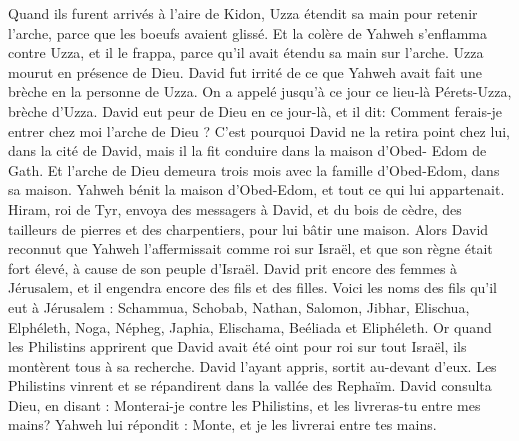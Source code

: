 \begin{multicols}{2}
Quand ils furent arrivés à l'aire de Kidon, Uzza  étendit sa main pour retenir l’arche, parce que les boeufs avaient glissé.
Et la colère de Yahweh s'enflamma contre Uzza, et il le frappa, parce qu'il avait étendu sa main sur l’arche. Uzza mourut en présence de Dieu.
David fut irrité de ce que Yahweh avait fait une brèche en la personne de Uzza. On a appelé jusqu'à ce jour ce lieu-là Pérets-Uzza, brèche d'Uzza.
David eut peur de Dieu en ce jour-là, et il dit: Comment ferais-je entrer chez moi l’arche de Dieu ?
C'est pourquoi David ne la retira point chez lui, dans la cité de David, mais il la fit conduire dans la maison d'Obed- Edom de Gath.
Et l’arche de Dieu demeura trois mois avec la famille d'Obed-Edom, dans sa maison. Yahweh bénit la maison d'Obed-Edom, et tout ce qui lui appartenait.
\VerseOne{}Hiram, roi de Tyr, envoya des messagers à David, et du bois de cèdre, des tailleurs de pierres et des charpentiers, pour lui bâtir une maison.
Alors David reconnut que Yahweh l'affermissait comme roi sur Israël, et que son règne était fort élevé, à cause de son peuple d'Israël.
David prit encore des femmes à Jérusalem, et il engendra encore des fils et des filles.
Voici les noms des fils qu'il eut à Jérusalem : Schammua, Schobab, Nathan, Salomon,
Jibhar, Elischua, Elphéleth,
Noga, Népheg, Japhia,
Elischama, Beéliada et Eliphéleth.
Or quand les Philistins apprirent que David avait été oint pour roi sur tout Israël, ils montèrent tous à sa recherche. David l'ayant appris, sortit au-devant d'eux.
Les Philistins vinrent et se répandirent dans la vallée des Rephaïm.
David consulta Dieu, en disant : Monterai-je contre les Philistins, et les livreras-tu entre mes mains? Yahweh lui répondit : Monte, et je les livrerai entre tes mains.

\end{multicols}
